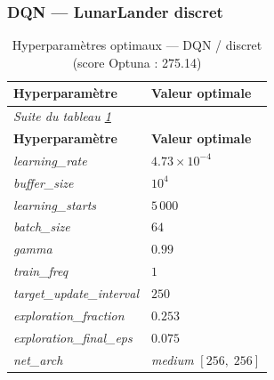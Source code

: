 \newlength{\hpOptA}\setlength{\hpOptA}{5.5cm}
 
\newpage
\subsubsection{DQN --- LunarLander discret}
 
\begingroup
\footnotesize
\setlength{\tabcolsep}{8pt}
\renewcommand{\arraystretch}{1.4}
\begin{longtable}{%
  p{\hpOptA}%
  p{\dimexpr\textwidth - \hpOptA - 4\tabcolsep\relax}%
}
  \caption{Hyperparamètres optimaux --- DQN / discret (score Optuna : 275.14)}
  \label{tab:hparams_opt_dqn}\\
  \toprule
  \textbf{Hyperparamètre} & \textbf{Valeur optimale} \\
  \midrule
\endfirsthead
  \multicolumn{2}{l}{\footnotesize\itshape Suite du tableau \ref{tab:hparams_opt_dqn}}\\[2pt]
  \toprule
  \textbf{Hyperparamètre} & \textbf{Valeur optimale} \\
  \midrule
\endhead
  \bottomrule
\endlastfoot
 
\textit{learning\_rate}           & $4.73 \times 10^{-4}$ \\
\textit{buffer\_size}             & $10^{4}$ \\
\textit{learning\_starts}         & $5\,000$ \\
\textit{batch\_size}              & $64$ \\
\textit{gamma}                    & $0.99$ \\
\textit{train\_freq}              & $1$ \\
\textit{target\_update\_interval} & $250$ \\
\textit{exploration\_fraction}    & $0.253$ \\
\textit{exploration\_final\_eps}  & $0.075$ \\
\textit{net\_arch}                & \textit{medium} $[256,\;256]$ \\
\end{longtable}
\endgroup
 
\medskip
 
